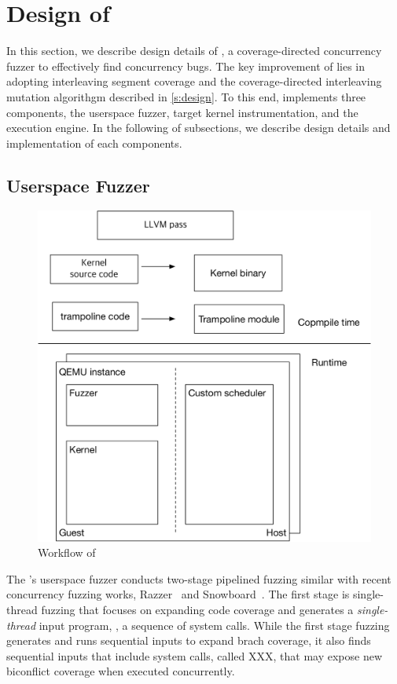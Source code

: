 \section{Design of \sys}
\label{s:impl}


In this section, we describe design details of \sys, a
coverage-directed concurrency fuzzer to effectively find concurrency
bugs.
%
The key improvement of \sys lies in adopting interleaving segment
coverage and the coverage-directed interleaving mutation algorithgm
described in \autoref{s:design}.
%
To this end, \sys implements three components, the userspace fuzzer,
target kernel instrumentation, and the execution engine.
%
In the following of subsections, we describe design details and
implementation of each components.


\subsection{Userspace Fuzzer}
\label{ss:fuzzer}



\begin{figure}
  \includegraphics[width=0.9\linewidth]{fig/architecture.pdf}
  \caption{Workflow of \sys {}}
  \label{fig:workflow}
\end{figure}


The \sys's userspace fuzzer conducts two-stage pipelined fuzzing
similar with recent concurrency fuzzing works, Razzer~\cite{razzer}
and Snowboard~\cite{snowboard}.
%
The first stage is single-thread fuzzing that focuses on expanding
code coverage and generates a \textit{single-thread} input program,
\ie, a sequence of system calls.
%
While the first stage fuzzing generates and runs sequential inputs to
expand brach coverage, it also finds sequential inputs that include
system calls, called XXX, that may expose new biconflict coverage when
executed concurrently.

